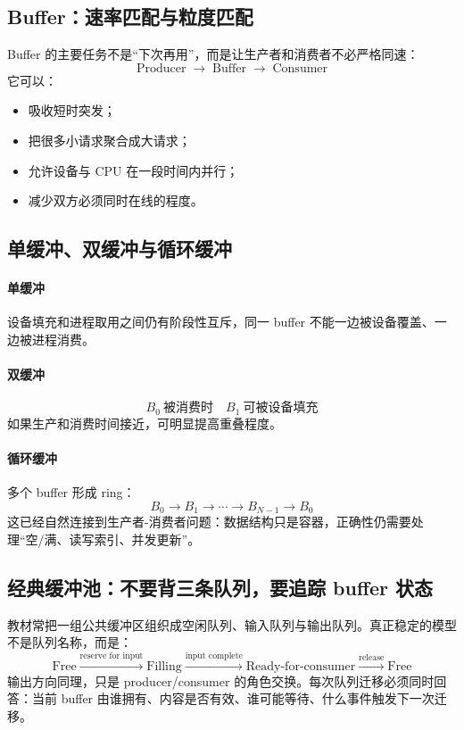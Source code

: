 \documentclass[UTF8,fontset=fandol,11pt,a4paper]{ctexart}
\newcommand{\arr}{\;\longrightarrow\;}
\begin{document}
\subsection{Buffer：速率匹配与粒度匹配}
Buffer 的主要任务不是“下次再用”，而是让生产者和消费者不必严格同速：
\[
\text{Producer}\arr\boxed{\text{Buffer}}\arr\text{Consumer}
\]
它可以：
\begin{itemize}
  \item 吸收短时突发；
  \item 把很多小请求聚合成大请求；
  \item 允许设备与 CPU 在一段时间内并行；
  \item 减少双方必须同时在线的程度。
\end{itemize}

\subsection{单缓冲、双缓冲与循环缓冲}
\paragraph{单缓冲}
设备填充和进程取用之间仍有阶段性互斥，同一 buffer 不能一边被设备覆盖、一边被进程消费。

\paragraph{双缓冲}
\[
B_0\ \text{被消费时}\quad B_1\ \text{可被设备填充}
\]
如果生产和消费时间接近，可明显提高重叠程度。

\paragraph{循环缓冲}
多个 buffer 形成 ring：
\[
B_0\to B_1\to\cdots\to B_{N-1}\to B_0
\]
这已经自然连接到生产者-消费者问题：数据结构只是容器，正确性仍需要处理“空/满、读写索引、并发更新”。

\subsection{经典缓冲池：不要背三条队列，要追踪 buffer 状态}

教材常把一组公共缓冲区组织成空闲队列、输入队列与输出队列。真正稳定的模型不是队列名称，而是：
\[
\boxed{
\text{Free}
\xrightarrow{\text{reserve for input}}
\text{Filling}
\xrightarrow{\text{input complete}}
\text{Ready-for-consumer}
\xrightarrow{\text{release}}
\text{Free}
}
\]
输出方向同理，只是 producer/consumer 的角色交换。每次队列迁移必须同时回答：当前 buffer 由谁拥有、内容是否有效、谁可能等待、什么事件触发下一次迁移。
\end{document}
